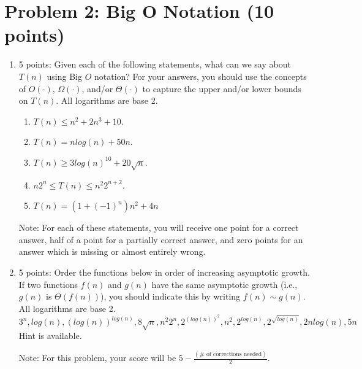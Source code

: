 \documentclass[12pt]{article}
\begin{document}
\section*{Problem 2: Big O Notation (10 points)}
\begin{enumerate}
\item[(a)] 5 points: Given each of the following statements, what can we say about $T(n)$ using Big $O$ notation? For your answers, you should use the concepts of $O(\cdot)$, $\Omega(\cdot)$, and/or $\Theta(\cdot)$ to capture the upper and/or lower bounds on $T(n)$. All logarithms are base 2. %
\begin{enumerate}
\item[1.] $T(n) \leq n^2 + 2n^3 + 10$.
\item[2.] $T(n) = nlog(n) + 50n$.
\item[3.] $T(n) \geq 3log(n)^{10} + 20\sqrt{n}$.
\item[4.] $n{2^n} \leq T(n) \leq {n^2}{2^{n+2}}$.
\item[5.] $T(n) = (1 + (-1)^n)n^2 + 4n$
\end{enumerate}
Note: For each of these statements, you will receive one point for a correct answer, half of a point for a partially correct answer, and zero points for an answer which is missing or almost entirely wrong.
\item[(b)] 5 points: Order the functions below in order of increasing asymptotic growth. If two functions $f(n)$ and $g(n)$ have the same asymptotic growth (i.e., $g(n)$ is $\Theta(f(n))$), you should indicate this by writing $f(n) \sim g(n)$. All logarithms are base 2.\\
$3^n, log(n), (log(n))^{log(n)}, 8\sqrt{n}, {n^2}2^n, 2^{(log(n))^2}, n^2, 2^{log(n)}, 2^{\sqrt{log(n)}}, 2nlog(n), 5n$\\
Hint is available.
 
Note: For this problem, your score will be $5-\frac{(\# \text{ of corrections needed})}{2}$.
\end{enumerate}
\end{document}
